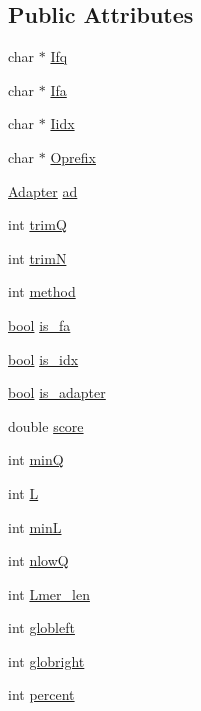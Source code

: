 \subsection*{Public Attributes}
\begin{DoxyCompactItemize}
\item 
char $\ast$ \hyperlink{struct__iparam__trimFilter_a5147310738277c148ca7109ba77829ca}{Ifq}
\item 
char $\ast$ \hyperlink{struct__iparam__trimFilter_a55796cd412ef4ca61a5a799d2f64beec}{Ifa}
\item 
char $\ast$ \hyperlink{struct__iparam__trimFilter_a158296e4d37ab3b033c6f9aee1516d71}{Iidx}
\item 
char $\ast$ \hyperlink{struct__iparam__trimFilter_ad24f2902b532a4ff2dfb1122941064b8}{Oprefix}
\item 
\hyperlink{init__trimFilter_8h_a3442d07a10a4ab75064687f3c244e370}{Adapter} \hyperlink{struct__iparam__trimFilter_aba4b2762da9029d272905c558986b3f7}{ad}
\item 
int \hyperlink{struct__iparam__trimFilter_a5b5344041c9313230de07c9485227203}{trim\+Q}
\item 
int \hyperlink{struct__iparam__trimFilter_a5f2d247cc26608ed5cc9e2d6943940d7}{trim\+N}
\item 
int \hyperlink{struct__iparam__trimFilter_a0b5f9bed4a7b4e2de8c917b42360f4d3}{method}
\item 
\hyperlink{defines_8h_abb452686968e48b67397da5f97445f5b}{bool} \hyperlink{struct__iparam__trimFilter_ac6093d26e41e61f82ffd2aa05f563f9c}{is\+\_\+fa}
\item 
\hyperlink{defines_8h_abb452686968e48b67397da5f97445f5b}{bool} \hyperlink{struct__iparam__trimFilter_afc50c477a3340ed7befc430d273ff6cb}{is\+\_\+idx}
\item 
\hyperlink{defines_8h_abb452686968e48b67397da5f97445f5b}{bool} \hyperlink{struct__iparam__trimFilter_a6d015b5bf1568c362d9ca0ff37b751f8}{is\+\_\+adapter}
\item 
double \hyperlink{struct__iparam__trimFilter_a193ef2030f6eb8db0b75afbbd152d6a1}{score}
\item 
int \hyperlink{struct__iparam__trimFilter_a1e2b69f148d9299815af6ab7f575ad1a}{min\+Q}
\item 
int \hyperlink{struct__iparam__trimFilter_a72fcc236d4136d2405a04f155b515894}{L}
\item 
int \hyperlink{struct__iparam__trimFilter_ac2b43664ca0c95a8572f97254893d675}{min\+L}
\item 
int \hyperlink{struct__iparam__trimFilter_aaeab85398303eada76cb6f32841fa094}{nlow\+Q}
\item 
int \hyperlink{struct__iparam__trimFilter_a8d64cf4832f3c403bd7c505d5a3fee75}{Lmer\+\_\+len}
\item 
int \hyperlink{struct__iparam__trimFilter_a2e626c5776d4423d20d5ec7606fe9b81}{globleft}
\item 
int \hyperlink{struct__iparam__trimFilter_ad5fb4ca1786b14cd63a8467187474f51}{globright}
\item 
int \hyperlink{struct__iparam__trimFilter_a8ed026b1de4fccc7288258c3a8faa395}{percent}
\end{DoxyCompactItemize}



